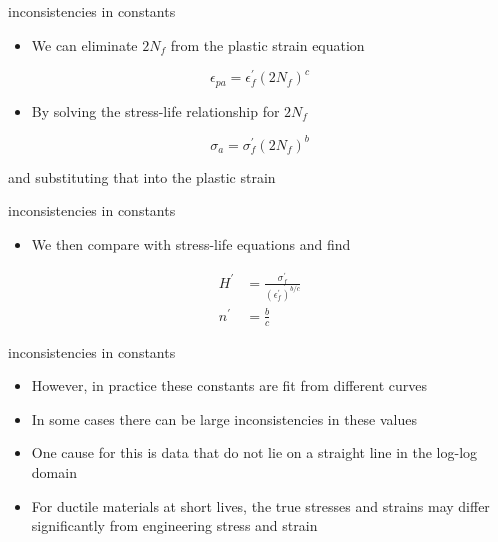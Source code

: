 \documentclass[
  letterpaper,
  ignorenonframetext,
  aspectratio=43,
  handout,
  12pt]{beamer}
\providecommand{\tightlist}{%
  \setlength{\itemsep}{0pt}\setlength{\parskip}{0pt}}
\providecommand{\tightlist}{%
\setlength{\itemsep}{0pt}\setlength{\parskip}{0pt}}
\begin{document}
\begin{frame}{inconsistencies in constants}
\protect\hypertarget{inconsistencies-in-constants-1}{}
\begin{itemize}
\tightlist
\item
  We can eliminate \(2N_f\) from the plastic strain equation
\end{itemize}

\[ \epsilon_{pa} = \epsilon_f^\prime (2 N_f)^c\]

\begin{itemize}
\tightlist
\item
  By solving the stress-life relationship for \(2 N_f\)
\end{itemize}

\[ \sigma_a = \sigma_f^\prime (2 N_f)^b \]

and substituting that into the plastic strain
\end{frame}

\begin{frame}{inconsistencies in constants}
\protect\hypertarget{inconsistencies-in-constants-2}{}
\begin{itemize}
\tightlist
\item
  We then compare with stress-life equations and find
\end{itemize}

\[\begin{aligned}
 H^\prime &= \frac{\sigma_f^\prime}{(\epsilon_f^\prime)^{b/c}}\\
 n^\prime &= \frac{b}{c}
\end{aligned}\]
\end{frame}

\begin{frame}{inconsistencies in constants}
\protect\hypertarget{inconsistencies-in-constants-3}{}
\begin{itemize}
\tightlist
\item
  However, in practice these constants are fit from different curves
\item
  In some cases there can be large inconsistencies in these values
\item
  One cause for this is data that do not lie on a straight line in the
  log-log domain
\item
  For ductile materials at short lives, the true stresses and strains
  may differ significantly from engineering stress and strain
\end{itemize}
\end{frame}
\end{document}
